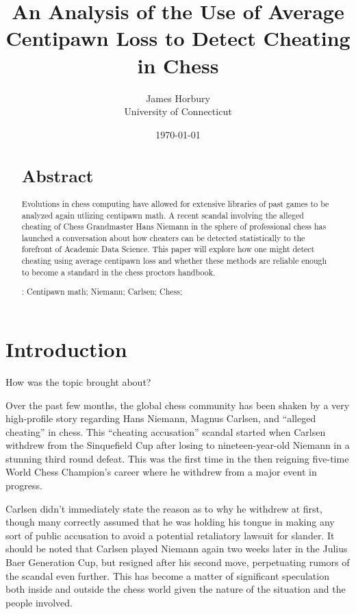 \documentclass[12pt, letterpaper, titlepage]{article}
\title{An Analysis of the Use of Average Centipawn Loss to Detect Cheating in Chess}
\author{James Horbury\\
    University of Connecticut
}
\date{\today}
\begin{document}
\maketitle

\begin{abstract}
\section*{Abstract}
\label{sec:abs}

Evolutions in chess computing have allowed for extensive libraries of past games to be analyzed again utlizing centipawn math. A recent scandal involving the alleged cheating of Chess Grandmaster Hans Niemann in the sphere of professional chess has launched a conversation about how cheaters can be detected statistically to the forefront of Academic Data Science. This paper will explore how one might detect cheating using average centipawn loss and whether these methods are reliable enough to become a standard in the chess proctors handbook.

\bigskip
\noindent{}:
Centipawn math; 
Niemann;
Carlsen;
Chess;
\end{abstract}

\section*{Introduction}
\label{sec:intro}

How was the topic brought about?




Over the past few months, the global chess community has been shaken by a very high-profile story regarding Hans Niemann, Magnus Carlsen, and “alleged cheating” in chess. This “cheating accusation” scandal started when Carlsen withdrew from the Sinquefield Cup after losing to nineteen-year-old Niemann in a stunning third round defeat. This was the first time in the then reigning five-time World Chess Champion's career where he withdrew from a major event in progress.

Carlsen didn't immediately state the reason as to why he withdrew at first, though many correctly assumed that he was holding his tongue in making any sort of public accusation to avoid a potential retaliatory lawsuit for slander. It should be noted that Carlsen played Niemann again two weeks later in the Julius Baer Generation Cup, but resigned after his second move, perpetuating rumors of the scandal even further. This has become a matter of significant speculation both inside and outside the chess world given the nature of the situation and the people involved. 
\end{document}
